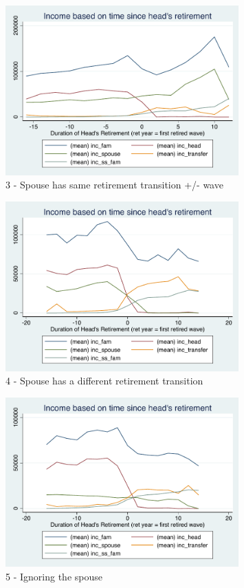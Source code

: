 \documentclass[11pt]{article}
\begin{document}
\begin{figure}[h]
	\caption{3 - Spouse has same retirement transition +/- wave}
	\centering
	\includegraphics[width=0.8\textwidth]{../IncomeAroundRetirement/Income_with_spouse_definition_3.pdf}
\end{figure}

\begin{figure}[h]
	\caption{4 - Spouse has a different retirement transition}
	\centering
	\includegraphics[width=0.8\textwidth]{../IncomeAroundRetirement/Income_with_spouse_definition_4.pdf}
\end{figure}

\begin{figure}[h]
	\caption{5 - Ignoring the spouse}
	\centering
	\includegraphics[width=0.8\textwidth]{../IncomeAroundRetirement/Income_with_spouse_definition_5.pdf}
\end{figure}
\end{document}
